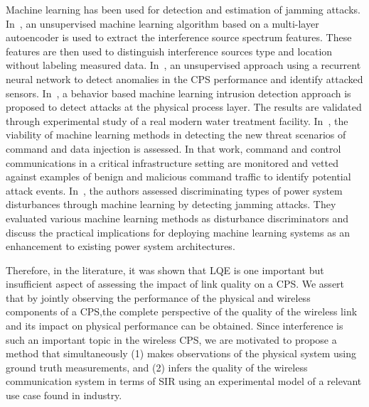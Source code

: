 Machine learning has been used for detection and estimation of jamming attacks. In~\cite{Chen2019}, an unsupervised machine learning algorithm based on a multi-layer autoencoder is used to extract the interference source spectrum features. These features are then used to distinguish interference sources type and location without labeling measured data. In~\cite{7911887},  an unsupervised approach using a recurrent neural network to detect anomalies in the CPS performance and identify attacked sensors. In~\cite{Junejo2016DataDP}, a behavior based machine learning intrusion detection approach  is proposed to detect attacks at the physical process layer. The results are validated through experimental study of a real modern water treatment facility. In~\cite{Beaver:2013:EML:2584691.2584722}, the viability of machine learning methods in detecting the new threat scenarios of command and data injection is assessed. In that work, command and control communications in a critical infrastructure setting are monitored and vetted against examples of benign and malicious command traffic to identify potential attack events. In~\cite{6900095}, the authors assessed discriminating types of power system disturbances through machine learning by detecting jamming attacks. They evaluated various machine learning methods as disturbance discriminators and discuss the practical implications for deploying machine learning systems as an enhancement to existing power system architectures.

Therefore, in the literature, it was shown that LQE is one important but insufficient aspect of assessing the impact of link quality on a CPS. We assert that by jointly observing the performance of the physical and wireless components of a CPS,the complete perspective of the quality of the wireless link and its impact on physical performance can be obtained. Since interference is such an important topic in the wireless CPS, we are motivated to propose a method that simultaneously (1) makes observations of the physical system using ground truth measurements, and (2) infers the quality of the wireless communication system in terms of SIR using an experimental model of a relevant use case found in industry.
